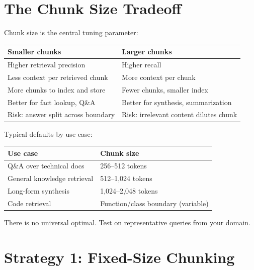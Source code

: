 \section{The Chunk Size Tradeoff}

Chunk size is the central tuning parameter:

\begin{center}
\begin{tabular}{ll}
\toprule
\textbf{Smaller chunks} & \textbf{Larger chunks} \\
\midrule
Higher retrieval precision & Higher recall \\
Less context per retrieved chunk & More context per chunk \\
More chunks to index and store & Fewer chunks, smaller index \\
Better for fact lookup, Q\&A & Better for synthesis, summarization \\
Risk: answer split across boundary & Risk: irrelevant content dilutes chunk \\
\bottomrule
\end{tabular}
\end{center}

Typical defaults by use case:

\begin{center}
\begin{tabular}{ll}
\toprule
\textbf{Use case} & \textbf{Chunk size} \\
\midrule
Q\&A over technical docs & 256--512 tokens \\
General knowledge retrieval & 512--1{,}024 tokens \\
Long-form synthesis & 1{,}024--2{,}048 tokens \\
Code retrieval & Function/class boundary (variable) \\
\bottomrule
\end{tabular}
\end{center}

There is no universal optimal. Test on representative queries from your domain.

\section{Strategy 1: Fixed-Size Chunking}

